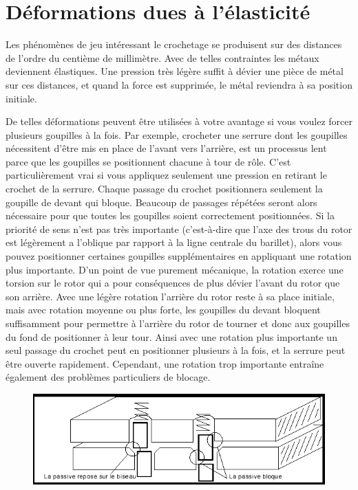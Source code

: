 \documentclass[a4paper,french,11pt,twoside]{report}
\begin{document}
\section{Déformations dues à l'élasticité}

Les phénomènes de jeu intéressant le crochetage se produisent sur des distances de l'ordre du centième de millimètre. Avec de telles contraintes les métaux deviennent élastiques. Une pression très légère suffit à dévier une pièce de métal sur ces distances, et quand la force est supprimée, le métal reviendra à sa position initiale.

De telles déformations peuvent être utilisées à votre avantage si vous voulez forcer plusieurs goupilles à la fois. Par exemple, crocheter une serrure dont les goupilles nécessitent d'être mis en place de l'avant vers l'arrière, est un processus lent parce que les goupilles se positionnent chacune à tour de rôle. C'est particulièrement vrai si vous appliquez seulement une pression en retirant le crochet de la serrure. Chaque passage du crochet positionnera seulement la goupille de devant qui bloque. Beaucoup de passages répétées seront alors nécessaire pour que toutes les goupilles soient correctement positionnées. Si la priorité de sens n'est pas très importante (c'est-à-dire que l'axe des trous du rotor est légèrement a l'oblique par rapport à la ligne centrale du barillet), alors vous pouvez positionner certaines goupilles supplémentaires en appliquant une rotation plus importante. D'un point de vue purement mécanique, la rotation exerce une torsion sur le rotor qui a pour conséquences de plus dévier l'avant du rotor que son arrière. Avec une légère rotation l'arrière du rotor reste à sa place initiale, mais avec rotation moyenne ou plus forte, les goupilles du devant bloquent suffisamment pour permettre à l'arrière du rotor de tourner et donc aux goupilles du fond de positionner à leur tour. Ainsi avec une rotation plus importante un seul passage du crochet peut en positionner plusieurs à la fois, et la serrure peut être ouverte rapidement. Cependant, une rotation trop importante entraîne également des problèmes particuliers de blocage.

\begin{figure}[h] \begin{center}
        \includegraphics[scale=0.7]{images/Image21}
        \caption{}
\end{center} \end{figure}
\end{document}
